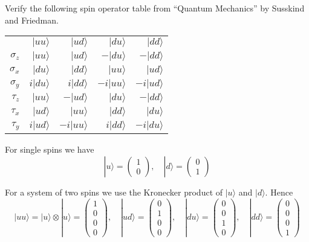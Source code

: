 \documentclass[12pt]{article}
\begin{document}
Verify the following spin operator table from ``Quantum Mechanics'' by Susskind and Friedman.

\begin{center}
\begin{tabular}{rrrrr}
& $|uu\rangle$ & $|ud\rangle$ & $|du\rangle$ & $|dd\rangle$
\\[1ex]
$\sigma_z$ & $|uu\rangle$ & $|ud\rangle$ & $-|du\rangle$ & $-|dd\rangle$
\\
$\sigma_x$ & $|du\rangle$ & $|dd\rangle$ & $|uu\rangle$ & $|ud\rangle$
\\
$\sigma_y$ & $i|du\rangle$ & $i|dd\rangle$ & $-i|uu\rangle$ & $-i|ud\rangle$
\\
$\tau_z$ & $|uu\rangle$ & $-|ud\rangle$ & $|du\rangle$ & $-|dd\rangle$
\\
$\tau_x$ & $|ud\rangle$ & $|uu\rangle$ & $|dd\rangle$ & $|du\rangle$
\\
$\tau_y$ & $i|ud\rangle$ & $-i|uu\rangle$ & $i|dd\rangle$ & $-i|du\rangle$
\end{tabular}
\end{center}

For single spins we have
\begin{equation*}
|u\rangle=\begin{pmatrix}1\\0\end{pmatrix},
\quad
|d\rangle=\begin{pmatrix}0\\1\end{pmatrix}
\end{equation*}

For a system of two spins we use the Kronecker product of $|u\rangle$ and $|d\rangle$.
Hence
\begin{equation*}
|uu\rangle=|u\rangle\otimes|u\rangle=\begin{pmatrix}1\\0\\0\\0\end{pmatrix},
\quad
|ud\rangle=\begin{pmatrix}0\\1\\0\\0\end{pmatrix},
\quad
|du\rangle=\begin{pmatrix}0\\0\\1\\0\end{pmatrix},
\quad
|dd\rangle=\begin{pmatrix}0\\0\\0\\1\end{pmatrix}
\end{equation*}
\end{document}
